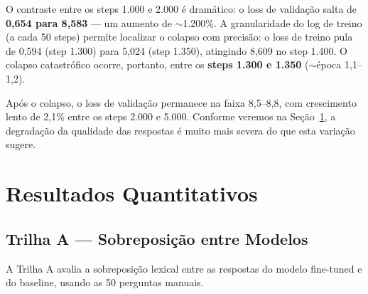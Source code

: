 O contraste entre os steps 1.000 e 2.000 é dramático: o loss de validação salta de \textbf{0,654 para 8,583} --- um aumento de $\sim$1.200\%. A granularidade do log de treino (a cada 50 steps) permite localizar o colapso com precisão: o loss de treino pula de 0,594 (step 1.300) para 5,024 (step 1.350), atingindo 8,609 no step 1.400. O colapso catastrófico ocorre, portanto, entre os \textbf{steps 1.300 e 1.350} ($\sim$época 1,1--1,2).

Após o colapso, o loss de validação permanece na faixa 8,5--8,8, com crescimento lento de 2,1\% entre os steps 2.000 e 5.000. Conforme veremos na Seção~\ref{sec:resultados-quantitativos}, a degradação da qualidade das respostas é muito mais severa do que esta variação sugere.

\section{Resultados Quantitativos}
\label{sec:resultados-quantitativos}

\subsection{Trilha A --- Sobreposição entre Modelos}

A Trilha A avalia a sobreposição lexical entre as respostas do modelo fine-tuned e do baseline, usando as 50 perguntas manuais.

\begin{table}[H]
\centering
\caption{Trilha A --- Métricas de sobreposição FT vs Baseline (50 perguntas manuais)}
\label{tab:trilha-a}
\end{table}

